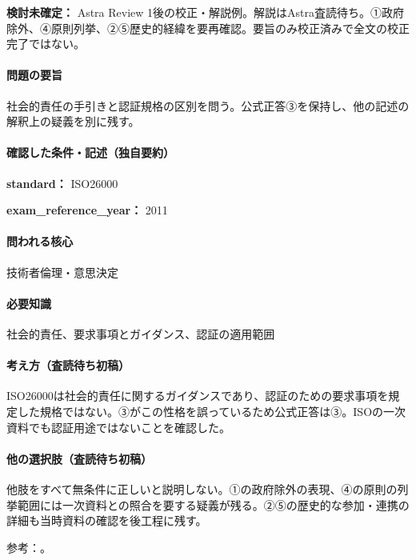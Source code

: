 \par\textbf{検討未確定：} Astra Review 1後の校正・解説例。解説はAstra査読待ち。①政府除外、④原則列挙、②⑤歴史的経緯を要再確認。要旨のみ校正済みで全文の校正完了ではない。

\paragraph{問題の要旨} 社会的責任の手引きと認証規格の区別を問う。公式正答③を保持し、他の記述の解釈上の疑義を別に残す。

\paragraph{確認した条件・記述（独自要約）}\mbox{}\par

\noindent\textbf{standard：} ISO26000\par

\noindent\textbf{exam\_reference\_year：} 2011\par

\paragraph{問われる核心} 技術者倫理・意思決定

\paragraph{必要知識} 社会的責任、要求事項とガイダンス、認証の適用範囲

\paragraph{考え方（査読待ち初稿）} ISO26000は社会的責任に関するガイダンスであり、認証のための要求事項を規定した規格ではない。③がこの性格を誤っているため公式正答は③。ISOの一次資料でも認証用途ではないことを確認した。

\paragraph{他の選択肢（査読待ち初稿）} 他肢をすべて無条件に正しいと説明しない。①の政府除外の表現、④の原則の列挙範囲には一次資料との照合を要する疑義が残る。②⑤の歴史的な参加・連携の詳細も当時資料の確認を後工程に残す。

\par 参考：\cite{iso26000}。

